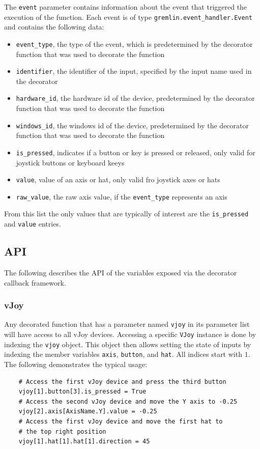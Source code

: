 \documentclass[a4, 10pt]{article}
\begin{document}
The \verb+event+ parameter contains information about the event that
triggered the execution of the function. Each event is of type
\verb+gremlin.event_handler.Event+ and contains the following data:

\begin{itemize}
    \item \verb+event_type+, the type of the event, which is predetermined by
        the decorator function that was used to decorate the function
    \item \verb+identifier+, the identifier of the input, specified by the
        input name used in the decorator
    \item \verb+hardware_id+, the hardware id of the device, predetermined by the
        decorator function that was used to decorate the function
    \item \verb+windows_id+, the windows id of the device, predetermined by the
        decorator function that was used to decorate the function
    \item \verb+is_pressed+, indicates if a button or key is pressed or
        released, only valid for joystick buttons or keyboard keeys
    \item \verb+value+, value of an axis or hat, only valid fro joystick axes
        or hats
    \item \verb+raw_value+, the raw axis value, if the \verb+event_type+
        represents an axis
\end{itemize}

From this list the only values that are typically of interest are the
\verb+is_pressed+ and \verb+value+ entries.


\subsection{API}
\label{sec:cm_api}

The following describes the API of the variables exposed via the
decorator callback framework.


\subsubsection{vJoy}

Any decorated function that has a parameter named \verb+vjoy+ in its
parameter list will have access to all vJoy devices.  Accessing a
specific \verb+VJoy+ instance is done by indexing the \verb+vjoy+
object. This object then allows setting the state of inputs by indexing
the member variables \verb+axis+, \verb+button+, and \verb+hat+.
All indices start with $1$. The following demonstrates the typical
usage:
\begin{verbatim}
    # Access the first vJoy device and press the third button
    vjoy[1].button[3].is_pressed = True
    # Access the second vJoy device and move the Y axis to -0.25
    vjoy[2].axis[AxisName.Y].value = -0.25
    # Access the first vJoy device and move the first hat to
    # the top right position
    vjoy[1].hat[1].hat[1].direction = 45
\end{verbatim}
\end{document}
